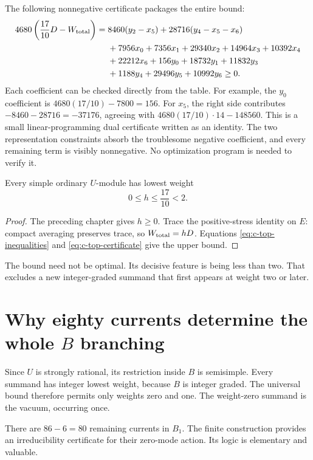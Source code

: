 The following nonnegative certificate packages the entire bound:
\begin{align}\label{eq:c-top-certificate}
4680\left(\frac{17}{10}D-W_{\rm total}\right)
={}&8460(y_2-x_5)+28716(y_4-x_5-x_6)\notag\\
 &+7956x_0+7356x_1+29340x_2+14964x_3+10392x_4\notag\\
 &+22212x_6+156y_0+18732y_1+11832y_3\notag\\
 &+1188y_4+29496y_5+10992y_6\geq0.
\end{align}
Each coefficient can be checked directly from the table. For example,
the $y_0$ coefficient is $4680(17/10)-7800=156$.
For $x_5$, the right side contributes
$-8460-28716=-37176$, agreeing with
$4680(17/10)\cdot14-148560$.
This is a small linear-programming dual certificate written as an
identity. The two representation constraints absorb the troublesome
negative coefficient, and every remaining term is visibly
nonnegative. No optimization program is needed to verify it.

\begin{proposition}
Every simple ordinary $U$-module has lowest weight
\[
 0\leq h\leq\frac{17}{10}<2.
\]
\end{proposition}
\begin{proof}
The preceding chapter gives $h\geq0$. Trace the positive-stress
identity on $E$: compact averaging preserves trace, so
$W_{\rm total}=hD$. Equations \eqref{eq:c-top-inequalities} and
\eqref{eq:c-top-certificate} give the upper bound.
\end{proof}

The bound need not be optimal. Its decisive feature is being less
than two. That excludes a new integer-graded summand that first
appears at weight two or later.

\section{\texorpdfstring{Why eighty currents determine the whole $B$ branching}{Why eighty currents determine the whole B branching}}

Since $U$ is strongly rational, its restriction inside $B$ is
semisimple. Every summand has integer lowest weight, because $B$ is
integer graded. The universal bound therefore permits only weights
zero and one. The weight-zero summand is the vacuum, occurring once.

There are $86-6=80$ remaining currents in $B_1$. The finite
construction provides an irreducibility certificate for their
zero-mode action. Its logic is elementary and valuable.

